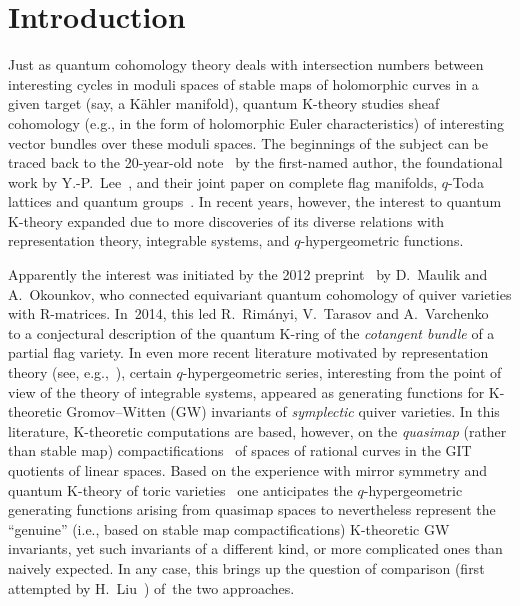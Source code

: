 \documentclass[pdftex]{sigma}
\numberwithin{equation}{section}
\begin{document}
\renewcommand{\thefootnote}{\arabic{footnote}}
\setcounter{footnote}{0}

\section{Introduction}

Just as quantum cohomology theory deals with intersection numbers between interesting cyc\-les in moduli spaces of stable maps of holomorphic curves in a given target (say, a K\"ahler manifold),
quantum K-theory studies sheaf cohomology (e.g., in the form of holomorphic Euler characteristics) of interesting vector bundles over these moduli spaces. The beginnings of the subject can be traced back to the 20-year-old note~\cite{Givental:WDVV} by the first-named author, the foundational work by Y.-P.~Lee~\cite{Lee}, and their joint paper on complete flag manifolds, $q$-Toda lattices and quantum groups~\cite{Givental-Lee}. In recent years, however, the interest to quantum K-theory expanded due to more discoveries of its diverse relations with representation theory, integrable systems, and $q$-hypergeometric functions.

Apparently the interest was initiated by the 2012 preprint~\cite{MO} by D.~Maulik and A.~Okoun\-kov, who connected equivariant quantum cohomology of quiver varieties with R-matrices. In~2014, this led R.~Rim{\'a}nyi, V.~Tarasov and A.~Varchenko~\cite{RTV} to a conjectural description of the quantum K-ring of the {\em cotangent bundle} of a partial flag variety. In even more recent literature motivated by representation theory (see, e.g.,~\cite{KPSZ, Ok, PSZ}), certain $q$-hypergeometric series, interesting from the point of view of the theory of integrable systems, appeared as generating functions for K-theoretic Gromov--Witten (GW) invariants of {\em symplectic} quiver varieties. In this literature, K-theoretic computations are based, however, on the {\em quasimap} (rather than stable map) compactifications~\cite{CKM} of spaces of rational curves in the GIT quotients of linear spaces. Based on the experience with mirror symmetry and quantum K-theory of toric varieties~\cite{Givental:perm5} one anticipates the $q$-hypergeometric generating functions arising from quasimap spaces to never\-theless represent the ``genuine'' (i.e., based on stable map compactifications) K-theoretic GW invariants, yet such invariants of a different kind, or more complicated ones than naively expec\-ted. In any case, this brings up the question of comparison (first attempted by H.~Liu~\cite{Liu}) of~the two approaches.
\end{document}
